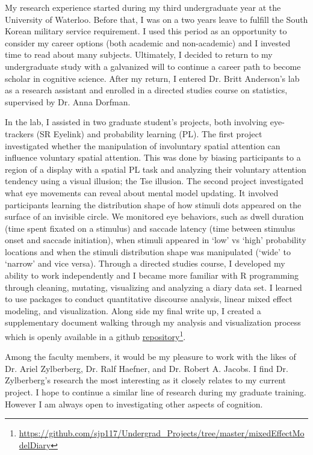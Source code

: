 \documentclass[12pt]{article}
\begin{document}
	My research experience started during my third undergraduate year at the University of Waterloo. Before that, I was on a two years leave to fulfill the South Korean military service requirement. I used this period as an opportunity to consider my career options (both academic and non-academic) and I invested time to read about many subjects. Ultimately, I decided to return to my undergraduate study with a galvanized will to continue a career path to become scholar in cognitive science. After my return, I entered Dr. Britt Anderson's lab as a research assistant and enrolled in a directed studies course on statistics, supervised by Dr. Anna Dorfman.

	In the lab, I assisted in two graduate student's projects, both involving eye-trackers (SR Eyelink) and probability learning (PL). The first project investigated whether the manipulation of involuntary spatial attention can influence voluntary spatial attention. This was done by biasing participants to a region of a display with a spatial PL task and analyzing their voluntary attention tendency using a visual illusion; the Tse illusion. The second project investigated what eye movements can reveal about mental model updating. It involved participants learning the distribution shape of how stimuli dots appeared on the surface of an invisible circle. We monitored eye behaviors, such as dwell duration (time spent fixated on a stimulus) and saccade latency (time between stimulus onset and saccade initiation), when stimuli appeared in `low' vs `high' probability locations and when the stimuli distribution shape was manipulated (`wide' to `narrow' and vice versa). Through a directed studies course, I developed my ability to work independently and I became more familiar with R programming through cleaning, mutating, visualizing and analyzing a diary data set. I learned to use packages to conduct quantitative discourse analysis, linear mixed effect modeling, and visualization. Along side my final write up, I created a supplementary document walking through my analysis and visualization process which is openly available in a github \href{https://github.com/sjp117/Undergrad_Projects/tree/master/mixedEffectModelDiary}{repository}\footnote{\url{https://github.com/sjp117/Undergrad\_Projects/tree/master/mixedEffectModelDiary}}.

	Among the faculty members, it would be my pleasure to work with the likes of Dr. Ariel Zylberberg, Dr. Ralf Haefner, and Dr. Robert A. Jacobs. I find Dr. Zylberberg’s research the most interesting as it closely relates to my current project. I hope to continue a similar line of research during my graduate training. However I am always open to investigating other aspects of cognition. 
	
\end{document}
